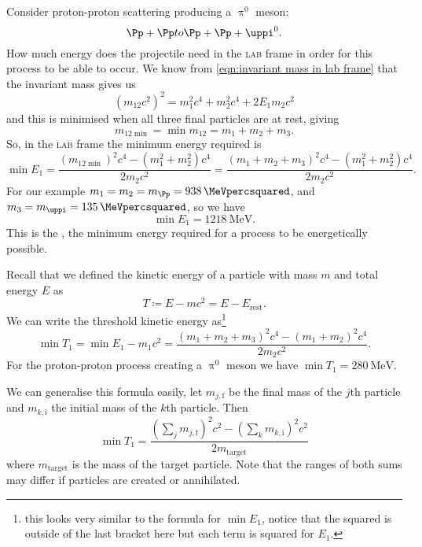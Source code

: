 \documentclass[fleqn]{NotesClass}
\makeatletter
\newcommand{\PBASE@pion}{\ensuremath{\uppi}}
\newcommand{\PBASE@pion}{\ensuremath{\pi}}
\newcommand{\Ppion}{\PBASE@pion}
\newcommand{\Ppionzero}{\ensuremath{\Ppion^0}}
\newcommand{\Ppi}{\Ppion}
\newcommand{\Ppizero}{\Ppionzero}
\newcommand{\LAB}{\textsc{lab}}
\makeatother
\begin{document}
    Consider proton-proton scattering producing a \Ppizero{} meson:
    \begin{equation}
        \Pp + \Pp to \Pp + \Pp + \Ppizero.
    \end{equation}
    How much energy does the projectile need in the \LAB{} frame in order for this process to be able to occur.
    We know from \cref{eqn:invariant mass in lab frame} that the invariant mass gives us
    \begin{equation}
        (m_{12}c^2)^2 = m_1^2c^4 + m_2^2c^4 + 2E_1m_2c^2
    \end{equation}
    and this is minimised when all three final particles are at rest, giving
    \begin{equation}
        m_{12\min} = \min m_{12} = m_1 + m_2 + m_3.
    \end{equation}
    So, in the \LAB{} frame the minimum energy required is
    \begin{equation}
        \min E_1 = \frac{(m_{12\min})^2 c^4 - (m_1^2 + m_2^2)c^4}{2m_2c^2} = \frac{(m_1 + m_2 + m_3)^2c^4 - (m_1^2 + m_2^2)c^4}{2m_2c^2}.
    \end{equation}
    For our example \(m_1 = m_2 = m_{\Pp} = \qty{938}{\MeVpercsquared}\), and \(m_3 = m_{\Ppi} = \qty{135}{\MeVpercsquared}\), so we have
    \begin{equation}
        \min E_1 = \qty{1218}{\MeV}.
    \end{equation}
    This is the , the minimum energy required for a process to be energetically possible.
    
    Recall that we defined the kinetic energy of a particle with mass \(m\) and total energy \(E\) as
    \begin{equation}
        T \coloneqq E - mc^2 = E - E_{\mathrm{rest}}.
    \end{equation}
    We can write the threshold kinetic energy as\footnote{this looks very similar to the formula for \(\min E_1\), notice that the squared is outside of the last bracket here but each term is squared for \(E_1\).}
    \begin{equation}
        \min T_1 = \min E_1 - m_1c^2 = \frac{(m_1 + m_2 + m_3)^2c^4 - (m_1 + m_2)^2c^4}{2m_2c^2}.
    \end{equation}
    For the proton-proton process creating a \Ppizero{} meson we have \(\min T_1 = \qty{280}{\MeV}\).
    
    We can generalise this formula easily, let \(m_{j,\mathrm{f}}\) be the final mass of the \(j\)th particle and \(m_{k, \mathrm{i}}\) the initial mass of the \(k\)th particle.
    Then
    \begin{equation}
        \min T_1 = \frac{(\sum_j m_{j,\mathrm{f}})^2c^2 - (\sum_k m_{k,\mathrm{i}})^2c^2}{2m_{\mathrm{target}}}
    \end{equation}
    where \(m_{\mathrm{target}}\) is the mass of the target particle.
    Note that the ranges of both sums may differ if particles are created or annihilated.
    
\end{document}
